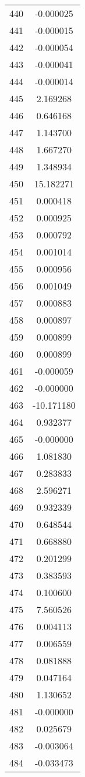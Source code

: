 \documentclass[12pt]{article}
\begin{document}
\begin{longtable}{@{}cc@{}}
440 & -0.000025 \\
441 & -0.000015 \\
442 & -0.000054 \\
443 & -0.000041 \\
444 & -0.000014 \\
445 & 2.169268 \\
446 & 0.646168 \\
447 & 1.143700 \\
448 & 1.667270 \\
449 & 1.348934 \\
450 & 15.182271 \\
451 & 0.000418 \\
452 & 0.000925 \\
453 & 0.000792 \\
454 & 0.001014 \\
455 & 0.000956 \\
456 & 0.001049 \\
457 & 0.000883 \\
458 & 0.000897 \\
459 & 0.000899 \\
460 & 0.000899 \\
461 & -0.000059 \\
462 & -0.000000 \\
463 & -10.171180 \\
464 & 0.932377 \\
465 & -0.000000 \\
466 & 1.081830 \\
467 & 0.283833 \\
468 & 2.596271 \\
469 & 0.932339 \\
470 & 0.648544 \\
471 & 0.668880 \\
472 & 0.201299 \\
473 & 0.383593 \\
474 & 0.100600 \\
475 & 7.560526 \\
476 & 0.004113 \\
477 & 0.006559 \\
478 & 0.081888 \\
479 & 0.047164 \\
480 & 1.130652 \\
481 & -0.000000 \\
482 & 0.025679 \\
483 & -0.003064 \\
484 & -0.033473 \\

\end{longtable}
\end{document}
